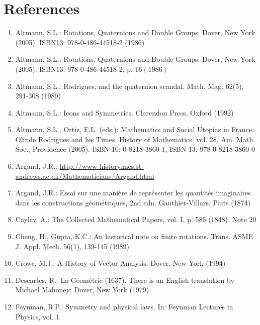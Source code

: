 
\section{References}
\begin{enumerate}
  \item Altmann, S.L.: Rotations, Quaternions and Double Groups. Dover, New York (2005). ISBN13: 978-0-486-44518-2 (1986)

  \item Altmann, S.L.: Rotations, Quaternions and Double Groups. Dover, New York (2005). ISBN13: 978-0-486-44518-2, p. $16(1986)$

  \item Altmann, S.L.: Rodrigues, and the quaternion scandal. Math. Mag. 62(5), 291-308 (1989)

  \item Altmann, S.L.: Icons and Symmetries. Clarendon Press, Oxford (1992)

  \item Altmann, S.L., Ortiz, E.L. (eds.): Mathematics and Social Utopias in France: Olinde Rodrigues and his Times. History of Mathematics, vol. 28. Am. Math. Soc., Providence (2005). ISBN-10: 0-8218-3860-1, ISBN-13: 978-0-8218-3860-0

  \item Argand, J.R.: \href{http://www-history.mcs.st-andrews.ac.uk/Mathematicians/Argand.html}{http://www-history.mcs.st-andrews.ac.uk/Mathematicians/Argand.html}

  \item Argand, J.R.: Essai sur une manière de représenter les quantités imaginaires dans les constructions géométriques, 2nd edn. Gauthier-Villars, Paris (1874)

  \item Cayley, A.: The Collected Mathematical Papers, vol. I, p. 586 (1848). Note 20

  \item Cheng, H., Gupta, K.C.: An historical note on finite rotations. Trans. ASME J. Appl. Mech. 56(1), 139-145 (1989)

  \item Crowe, M.J.: A History of Vector Analysis. Dover, New York (1994)

  \item Descartes, R.: La Géométrie (1637). There is an English translation by Michael Mahoney: Dover, New York (1979).

  \item Feynman, R.P.: Symmetry and physical laws. In: Feynman Lectures in Physics, vol. 1


\end{enumerate}
